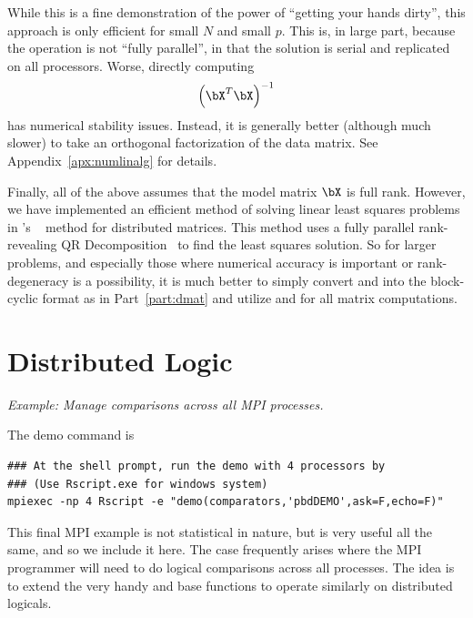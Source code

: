While this is a fine demonstration of the power of
``getting your hands dirty'', this approach is only efficient for
small $N$ and small $p$. This is, in large part, because the operation
is not ``fully parallel'', in that the solution is serial and replicated
on all processors. Worse, directly computing
\begin{align*}
\left(\bX^T\bX\right)^{-1}
\end{align*}
has numerical stability issues. Instead, it is generally better
(although much slower) to take an orthogonal factorization of the data matrix.
See Appendix~\ref{apx:numlinalg} for details.

Finally, all of the above assumes that the model matrix $\bX$ is full rank.
However, we have implemented an efficient method of solving linear least
squares problems in 's
~
method for distributed matrices. This method uses a fully parallel
rank-revealing QR Decomposition~
to find the least squares solution. So for larger problems, and especially
those where numerical accuracy is important or rank-degeneracy is
a possibility, it is much better to simply convert
 and 
into the block-cyclic format as
in Part~\ref{part:dmat} and utilize  and 
for all matrix computations.








\section{Distributed Logic}%

\emph{Example:  Manage comparisons across all MPI processes.}

The demo command is
\begin{lstlisting}
### At the shell prompt, run the demo with 4 processors by
### (Use Rscript.exe for windows system)
mpiexec -np 4 Rscript -e "demo(comparators,'pbdDEMO',ask=F,echo=F)"
\end{lstlisting}

This final MPI example is not statistical in nature, but is very useful
all the same, and so we include it here. The case frequently arises where
the MPI programmer will need to do logical comparisons across all processes.
The idea is to extend the very handy  and 
base  functions to operate similarly on distributed logicals.


